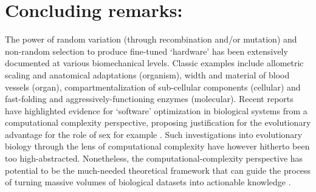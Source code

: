 \section{Concluding remarks:}

    The power of random variation (through recombination and/or mutation) and non-random selection
 	to produce fine-tuned `hardware' has been extensively documented at various biomechanical levels. Classic examples include
    allometric scaling and anatomical adaptations (organism), width and material of blood vessels (organ), %
    compartmentalization of sub-cellular components (cellular) and fast-folding and aggressively-functioning enzymes (molecular).
 	Recent reports \cite{livnat_analytical_2011, chastain_algorithms_2014} have highlighted evidence for `software' optimization in biological systems from a computational complexity perspective, proposing justification for the evolutionary advantage for the role of sex for example \cite{livnat_sex_2016}.
    Such investigations into evolutionary biology through the lens of computational complexity have however hitherto been too high-abstracted. Nonetheless, the computational-complexity perspective has potential to be the much-needed theoretical framework that can guide the process of turning massive volumes of biological datasets into actionable knowledge \cite{brenner_turing_2012}.

